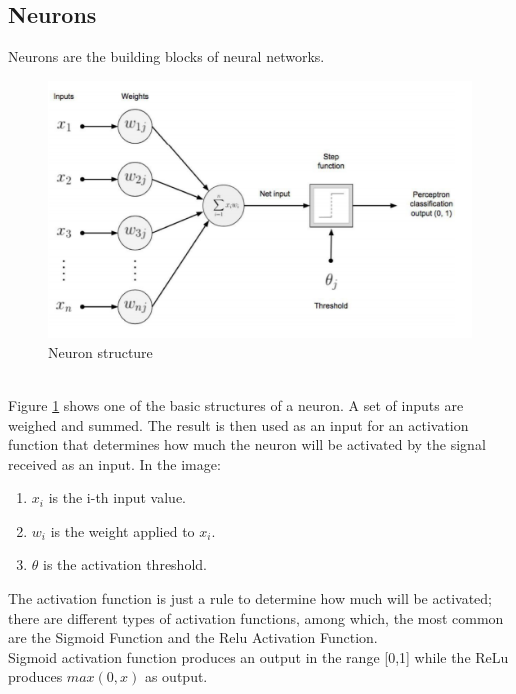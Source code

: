 \subsection{Neurons}
Neurons are the building blocks of neural networks.
\begin{figure}[b]
    \centering
        \includegraphics[width=0.7\linewidth]{images/deepLearning/neural block.png}
    \caption{Neuron structure \cite{DeepLearningApproach} }
    \label{fig:Neuron}
\end{figure}\\
Figure \ref{fig:Neuron} shows one of the basic structures of a neuron. A set of inputs are weighed and summed. The result is then used as an input for an activation function that determines how much the neuron will be activated by the signal received as an input. In the image:
\begin{enumerate}
    \item $x_i$ is the i-th input value.
    \item $w_i$ is the weight applied to $x_i$.
    \item $\theta$ is the activation threshold.
\end{enumerate}
The activation function is just a rule to determine how much will be activated; there are different types of activation functions, among which, the most common are the Sigmoid Function and the Relu Activation Function.\\
Sigmoid activation function produces an output in the range [0,1] while the ReLu produces $max(0,x)$ as output.
